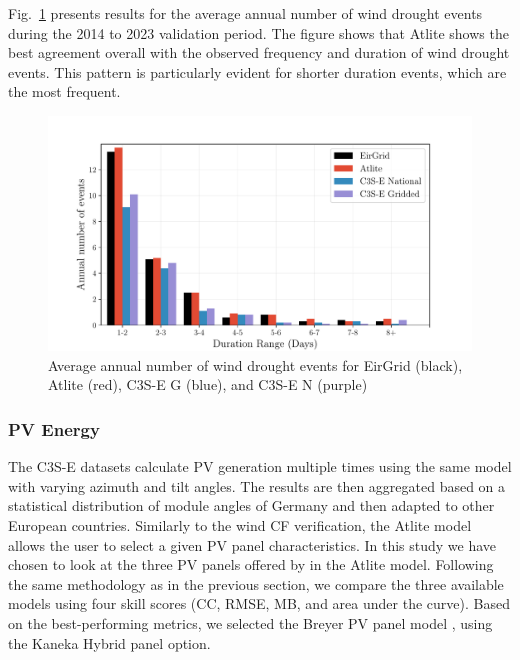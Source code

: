 \documentclass[a4paper, 11pt]{article}
\begin{document}
Fig.~\ref{fig:bar_number_events_verification_wind} presents results for the average annual number of wind drought events during the 2014 to 2023 validation period. The figure shows that Atlite shows the best agreement overall with the observed frequency and duration of wind drought events. This pattern is particularly evident for shorter duration events, which are the most frequent.

\begin{figure}[!ht]
	\centering
	\includegraphics[width=\textwidth]{verification_wind_bar}
	\caption{Average annual number of wind drought events for EirGrid (black), Atlite (red), C3S-E G (blue), and C3S-E N (purple)}
	\label{fig:bar_number_events_verification_wind}
\end{figure}

\newpage
\subsubsection{PV Energy}
\label{sec:pv_verification}

The C3S-E datasets calculate PV generation multiple times using the same model with varying azimuth and tilt angles. The results are then aggregated based on a statistical distribution of module angles of Germany and then adapted to other European countries. Similarly to the wind CF verification, the Atlite model allows the user to select a given PV panel characteristics. In this study we have chosen to look at the three PV panels offered by in the Atlite model. Following the same methodology as in the previous section, we compare the three available models using four skill scores (CC, RMSE, MB, and area under the curve). Based on the best-performing metrics, we selected the Breyer PV panel model \cite{beyer2004pv}, using the Kaneka Hybrid panel option.
\end{document}
